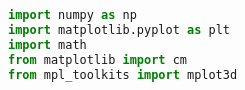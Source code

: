 \begin{lstlisting}[language=Python, style=jupycolors]
import numpy as np
import matplotlib.pyplot as plt
import math
from matplotlib import cm
from mpl_toolkits import mplot3d
\end{lstlisting}